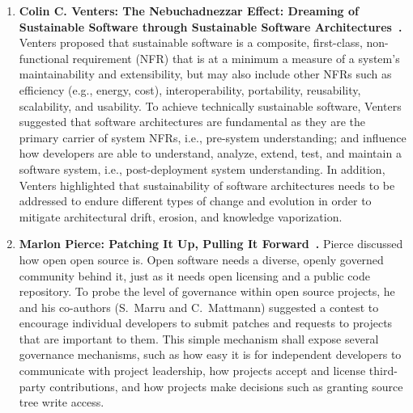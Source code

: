 \documentclass[11pt, oneside]{amsart}
\begin{document}

\begin{enumerate}
\item \textbf{Colin C. Venters: The Nebuchadnezzar Effect: Dreaming of Sustainable
Software through Sustainable Software Architectures~\cite{Venters_poster}.}
Venters proposed that sustainable software is a composite, first-class,
non-functional requirement (NFR) that is at a minimum a measure of a system's
maintainability and extensibility, but may also include other NFRs such as
efficiency (e.g., energy, cost), interoperability, portability, reusability,
scalability, and usability. To achieve technically sustainable software, Venters
suggested that software architectures are fundamental as they are the primary
carrier of system NFRs, i.e., pre-system understanding; and influence how
developers are able to understand, analyze, extend, test, and maintain a
software system, i.e., post-deployment system understanding. In addition,
Venters highlighted that sustainability of software architectures needs to be
addressed to endure different types of change and evolution in order to mitigate
architectural drift, erosion, and knowledge vaporization.



\item \textbf{Marlon Pierce: Patching It Up, Pulling It
Forward~\cite{Pierce_poster}.} Pierce discussed how open open source is. Open
software needs a diverse, openly governed community behind it, just as it needs
open licensing and a public code repository. To probe the level of governance
within open source projects, he and his co-authors (S.~Marru and C.~Mattmann)
suggested a contest to encourage individual developers to submit
patches and requests to projects that are important to them. This simple
mechanism shall expose several governance mechanisms, such as how easy it is for
independent developers to communicate with project leadership, how projects
accept and license third-party contributions, and how projects make
decisions such as granting source tree write access.


\end{enumerate}
\end{document}
